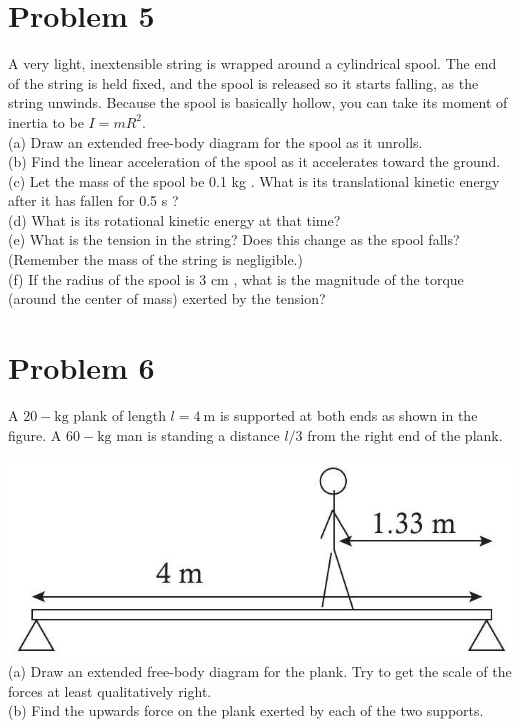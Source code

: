 \documentclass[10pt]{article}
\begin{document}
\section*{Problem 5}
A very light, inextensible string is wrapped around a cylindrical spool. The end of the string is held fixed, and the spool is released so it starts falling, as the string unwinds. Because the spool is basically hollow, you can take its moment of inertia to be $I=m R^{2}$.\\
(a) Draw an extended free-body diagram for the spool as it unrolls.\\
(b) Find the linear acceleration of the spool as it accelerates toward the ground.\\
(c) Let the mass of the spool be 0.1 kg . What is its translational kinetic energy after it has fallen for 0.5 s ?\\
(d) What is its rotational kinetic energy at that time?\\
(e) What is the tension in the string? Does this change as the spool falls? (Remember the mass of the string is negligible.)\\
(f) If the radius of the spool is 3 cm , what is the magnitude of the torque (around the center of mass) exerted by the tension?

\section*{Problem 6}
A $20-\mathrm{kg}$ plank of length $l=4 \mathrm{~m}$ is supported at both ends as shown in the figure. A $60-\mathrm{kg}$ man is standing a distance $l / 3$ from the right end of the plank.

\includegraphics[max width=\textwidth, center]{2024_09_14_9969b06773f10b6936e8g-237}\\
(a) Draw an extended free-body diagram for the plank. Try to get the scale of the forces at least qualitatively right.\\
(b) Find the upwards force on the plank exerted by each of the two supports.
\end{document}
